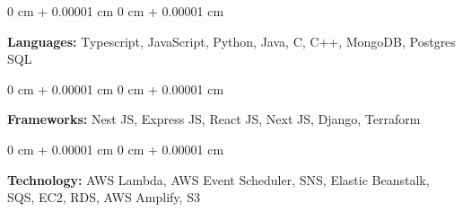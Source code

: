 \documentclass[10pt, letterpaper]{article}
\newenvironment{onecolentry}{
    \begin{adjustwidth}{
        0 cm + 0.00001 cm
    }{
        0 cm + 0.00001 cm
    }
}{
    \end{adjustwidth}
} %
\begin{document}
        
        \begin{onecolentry}
            \textbf{Languages:} Typescript, JavaScript, Python, Java, C, C++, MongoDB, Postgres SQL
        \end{onecolentry}

        \vspace{0.2 cm}

        \begin{onecolentry}
            \textbf{Frameworks:} Nest JS, Express JS, React JS, Next JS, Django, Terraform
        \end{onecolentry}
        \vspace{0.2 cm}
        \begin{onecolentry}
            \textbf{Technology:} AWS Lambda, AWS Event Scheduler, SNS, Elastic Beanstalk, SQS, EC2, RDS, AWS Amplify, S3
        \end{onecolentry}

    
\end{document}
